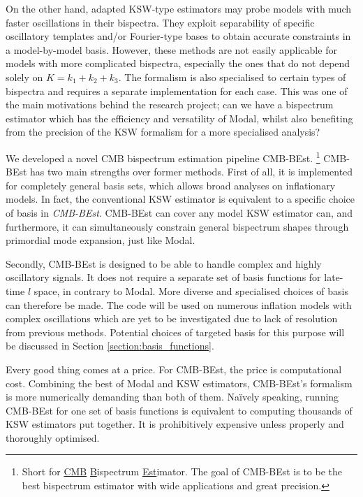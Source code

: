 On the other hand, adapted KSW-type estimators \cite{Munchmeyer2014,Munchmeyer2015resonance,Meerburg2016jointResonance} may probe models with much faster oscillations in their bispectra. They exploit separability of specific oscillatory templates and/or Fourier-type bases to obtain accurate constraints in a model-by-model basis. However, these methods are not easily applicable for models with more complicated bispectra, especially the ones that do not depend solely on $K=k_1+k_2+k_3$. The formalism is also specialised to certain types of bispectra and requires a separate implementation for each case. This was one of the main motivations behind the research project; can we have a bispectrum estimator which has the efficiency and versatility of Modal, whilst also benefiting from the precision of the KSW formalism for a more specialised analysis?

We developed a novel CMB bispectrum estimation pipeline CMB-BEst. \footnote{Short for \underline{CMB} \underline{B}ispectrum \underline{Est}imator. The goal of CMB-BEst is to be the best bispectrum estimator with wide applications and great precision.} CMB-BEst has two main strengths over former methods. First of all, it is implemented for completely general basis sets, which allows broad analyses on inflationary models. In fact, the conventional KSW estimator is equivalent to a specific choice of basis in \textit{CMB-BEst}. CMB-BEst can cover any model KSW estimator can, and furthermore, it can simultaneously constrain general bispectrum shapes through primordial mode expansion, just like Modal.

Secondly, CMB-BEst is designed to be able to handle complex and highly oscillatory signals. It does not require a separate set of basis functions for late-time $l$ space, in contrary to Modal. More diverse and specialised choices of basis can therefore be made. The code will be used on numerous inflation models with complex oscillations which are yet to be investigated due to lack of resolution from previous methods. Potential choices of targeted basis for this purpose will be discussed in Section \ref{section:basis_functions}.

Every good thing comes at a price. For CMB-BEst, the price is computational cost. Combining the best of Modal and KSW estimators, CMB-BEst's formalism is more numerically demanding than both of them. Na\"ively speaking, running CMB-BEst for one set of basis functions is equivalent to computing thousands of KSW estimators put together. It is prohibitively expensive unless properly and thoroughly optimised.


